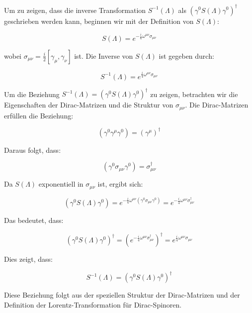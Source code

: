 Um zu zeigen, dass die inverse Transformation $S^{-1}(\Lambda)$ als $\left(\gamma^0 S(\Lambda) \gamma^0\right)^{\dagger}$ geschrieben werden kann, beginnen wir mit der Definition von $S(\Lambda)$:

\[
S(\Lambda) = e^{-\frac{i}{4} \omega^{\mu \nu} \sigma_{\mu \nu}}
\]

wobei $\sigma_{\mu \nu} = \frac{i}{2} [\gamma_\mu, \gamma_\nu]$ ist. Die Inverse von $S(\Lambda)$ ist gegeben durch:

\[
S^{-1}(\Lambda) = e^{\frac{i}{4} \omega^{\mu \nu} \sigma_{\mu \nu}}
\]

Um die Beziehung $S^{-1}(\Lambda) = \left(\gamma^0 S(\Lambda) \gamma^0\right)^{\dagger}$ zu zeigen, betrachten wir die Eigenschaften der Dirac-Matrizen und die Struktur von $\sigma_{\mu \nu}$. Die Dirac-Matrizen erfüllen die Beziehung:

\[
(\gamma^0 \gamma^\mu \gamma^0) = (\gamma^\mu)^\dagger
\]

Daraus folgt, dass:

\[
(\gamma^0 \sigma_{\mu \nu} \gamma^0) = \sigma_{\mu \nu}^\dagger
\]

Da $S(\Lambda)$ exponentiell in $\sigma_{\mu \nu}$ ist, ergibt sich:

\[
\left(\gamma^0 S(\Lambda) \gamma^0\right) = e^{-\frac{i}{4} \omega^{\mu \nu} (\gamma^0 \sigma_{\mu \nu} \gamma^0)} = e^{-\frac{i}{4} \omega^{\mu \nu} \sigma_{\mu \nu}^\dagger}
\]

Das bedeutet, dass:

\[
\left(\gamma^0 S(\Lambda) \gamma^0\right)^{\dagger} = \left(e^{-\frac{i}{4} \omega^{\mu \nu} \sigma_{\mu \nu}^\dagger}\right)^{\dagger} = e^{\frac{i}{4} \omega^{\mu \nu} \sigma_{\mu \nu}}
\]

Dies zeigt, dass:

\[
S^{-1}(\Lambda) = \left(\gamma^0 S(\Lambda) \gamma^0\right)^{\dagger}
\]

Diese Beziehung folgt aus der speziellen Struktur der Dirac-Matrizen und der Definition der Lorentz-Transformation für Dirac-Spinoren.